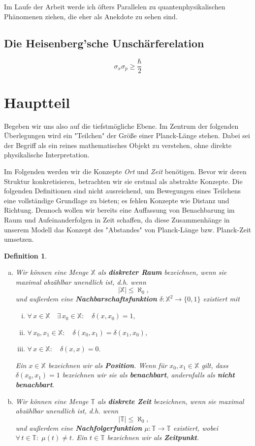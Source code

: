 \documentclass[a4paper,12pt,ngerman]{scrartcl}
\theoremstyle{plain}
\newtheorem{definition}{Definition}
\theoremstyle{plain}
\theoremstyle{plain}
\theoremstyle{plain}
\newcommand{\T}{\mathbb{T}}
\newcommand{\X}{\mathbb{X}}
\begin{document}
Im Laufe der Arbeit werde ich öfters Parallelen zu quantenphysikalischen Phänomenen ziehen, die eher als Anekdote zu sehen sind. %

\subsection{Die Heisenberg'sche Unschärferelation}


\[\sigma_x \sigma_p \geq \frac{\hbar}{2}\]

\section{Hauptteil}

Begeben wir uns also auf die tiefstmögliche Ebene. Im Zentrum der folgenden Überlegungen wird ein "Teilchen" der Größe einer Planck-Länge stehen. Dabei sei der Begriff als ein reines mathematisches Objekt zu verstehen, ohne direkte physikalische Interpretation.

Im Folgenden werden wir die Konzepte \textit{Ort} und \textit{Zeit} benötigen. Bevor wir deren Struktur konkretisieren, betrachten wir sie erstmal als abstrakte Konzepte. Die folgenden Definitionen sind nicht ausreichend, um Bewegungen eines Teilchens eine vollständige Grundlage zu bieten; es fehlen Konzepte wie Distanz und Richtung. Dennoch wollen wir bereits eine Auffassung von Benachbarung im Raum und Aufeinanderfolgen in Zeit schaffen, da diese Zusammenhänge in unserem Modell das Konzept des "Abstandes" von Planck-Länge bzw. Planck-Zeit umsetzen.

\begin{definition}\label{def_ortundzeit}
\begin{enumerate}[(a)]
	\item Wir können eine Menge $\X$ als \textbf{diskreter Raum} 	bezeichnen, wenn sie maximal abzählbar unendlich ist, d.h. 			wenn
	\[ |\X| \leq \aleph_0,\]
	und außerdem eine \textbf{Nachbarschaftsfunktion} $\delta: 			\X^2\rightarrow\{0,1\}$ existiert mit
	\begin{enumerate}[(i)]
		\item$\forall\, x\in\X\quad\exists\, x_0\in\X: \quad				\delta(x,x_0)=1,$
		\item$\forall\, x_0,x_1\in\X: \quad\delta(x_0,x_1)=					\delta(x_1,x_0),$ 
		\item$\forall\, x\in\X: \quad \delta(x,x)=0.$
	\end{enumerate}
	Ein $x\in\X$ bezeichnen wir als \textbf{Position}. Wenn für 		$x_0,x_1\in\X$ gilt, dass $\delta(x_0,x_1)=1$ bezeichnen wir 	sie als \textbf{benachbart}, andernfalls als \textbf{nicht 			benachbart}. 
	\item Wir können eine Menge $\T$ als \textbf{diskrete Zeit} 		bezeichnen, wenn sie maximal abzählbar unendlich ist, d.h. 			wenn
	\[ |\T| \leq \aleph_0,\]
	und außerdem eine \textbf{Nachfolgerfunktion} $\mu: \T 				\rightarrow \T$ existiert, wobei $\forall \,t\in\T: \;\mu(t)		\neq t$. Ein $t\in\T$ bezeichnen wir als \textbf{Zeitpunkt}.
\end{enumerate}
\end{definition} %
\end{document}
